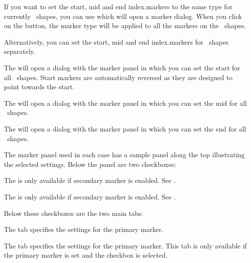 
If you want to set the start, mid and end \glspl{index.marker} to
the same type for currently \selected\ shapes, you can use
 which will open a marker dialog.
When you click on the  button, the marker type
will be applied to all the markers on the \selected\ shapes.

Alternatively, you can set the start, mid and end
\glspl{index.marker} for \selected\ shapes separately.


The  will open a dialog with the
marker panel in which you can set the start  for
all \selected\ shapes. Start markers are automatically reversed as
they are designed to point towards the start.


The  will open a dialog with the
marker panel in which you can set the mid  for
all \selected\ shapes.


The  will open a dialog with the
marker panel in which you can set the end  for
all \selected\ shapes.

The marker panel used in each case has a sample panel along the top
illustrating the selected settings. Below the panel are two
checkboxes:


The  is only available if secondary marker
is enabled. See .


The  is only available if secondary marker
is enabled. See .

Below these checkboxes are the two main tabs:


The  tab specifies the settings for the
primary marker.


The  tab specifies the settings for the
primary marker. This tab is only available if the primary marker is
set and the  checkbox is selected.

